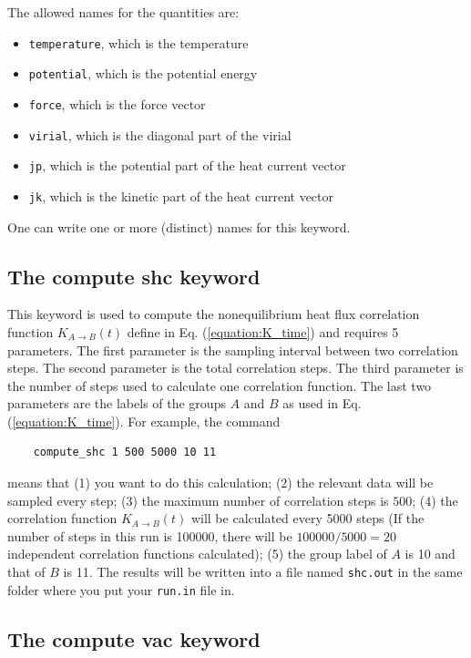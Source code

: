 \documentclass[12pt,a4paper]{report}
\begin{document}
The allowed names for the quantities are:
\begin{itemize}
\item \verb"temperature", which is the temperature
\item \verb"potential", which is the potential energy
\item \verb"force", which is the force vector
\item \verb"virial", which is the diagonal part of the virial
\item \verb"jp", which is the potential part of the heat current vector
\item \verb"jk", which is the kinetic part of the heat current vector
\end{itemize}
One can write one or more (distinct) names for this keyword.


\subsection{The compute shc keyword}

This keyword is used to compute the nonequilibrium heat flux correlation function $K_{A \rightarrow B}(t)$ define in Eq. (\ref{equation:K_time}) and requires 5 parameters. The first parameter is the sampling interval between two correlation steps. The second parameter is the total correlation steps. The third parameter is the number of steps used to calculate one correlation function. The last two parameters are the labels of the groups $A$ and $B$ as used in Eq. (\ref{equation:K_time}). For example, the command
\begin{verbatim}
    compute_shc 1 500 5000 10 11
\end{verbatim}
means that (1) you want to do this calculation; (2) the relevant data will be sampled every step; (3) the maximum number of correlation steps is $500$; (4) the correlation function $K_{A \rightarrow B}(t)$ will be calculated every 5000 steps (If the number of steps in this run is 100000, there will be $100000/5000=20$ independent correlation functions calculated); (5) the group label of $A$ is 10 and that of $B$ is 11. The results will be written into a file named \verb"shc.out" in the same folder where you put your \verb"run.in" file in.


\subsection{The compute vac keyword}
\end{document}
